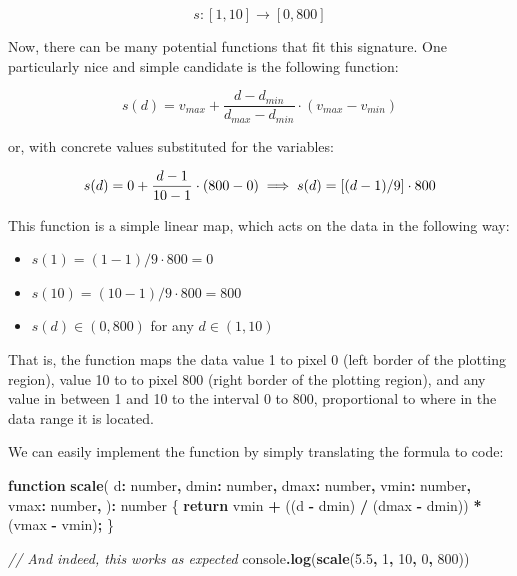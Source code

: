 \documentclass[
]{book}
\newenvironment{Shaded}{\begin{snugshade}}{\end{snugshade}}
\newcommand{\BuiltInTok}[1]{#1}
\newcommand{\CommentTok}[1]{\textcolor[rgb]{0.56,0.35,0.01}{\textit{#1}}}
\newcommand{\ControlFlowTok}[1]{\textcolor[rgb]{0.13,0.29,0.53}{\textbf{#1}}}
\newcommand{\DataTypeTok}[1]{\textcolor[rgb]{0.13,0.29,0.53}{#1}}
\newcommand{\DecValTok}[1]{\textcolor[rgb]{0.00,0.00,0.81}{#1}}
\newcommand{\FloatTok}[1]{\textcolor[rgb]{0.00,0.00,0.81}{#1}}
\newcommand{\FunctionTok}[1]{\textcolor[rgb]{0.13,0.29,0.53}{\textbf{#1}}}
\newcommand{\KeywordTok}[1]{\textcolor[rgb]{0.13,0.29,0.53}{\textbf{#1}}}
\newcommand{\NormalTok}[1]{#1}
\newcommand{\OperatorTok}[1]{\textcolor[rgb]{0.81,0.36,0.00}{\textbf{#1}}}
\providecommand{\tightlist}{%
  \setlength{\itemsep}{0pt}\setlength{\parskip}{0pt}}
\theoremstyle{definition}
\theoremstyle{definition}
\theoremstyle{definition}
\theoremstyle{definition}
\theoremstyle{remark}
\begin{document}
\[s: [1, 10] \to [0, 800]\]

Now, there can be many potential functions that fit this signature. One particularly nice and simple candidate is the following function:

\[s(d) = v_{max} + \frac{d - d_{min}}{d_{max} - d_{min}} \cdot (v_{max} - v_{min})\]

or, with concrete values substituted for the variables:

\[s(d) = 0 + \frac{d - 1}{10 - 1} \cdot (800 - 0) \\ \implies s(d) = [(d - 1) / 9] \cdot 800\]

This function is a simple linear map, which acts on the data in the following way:

\begin{itemize}
\tightlist
\item
  \(s(1) = (1 - 1) / 9 \cdot 800 = 0\)
\item
  \(s(10) = (10 - 1) / 9 \cdot 800 = 800\)
\item
  \(s(d) \in (0, 800)\) for any \(d \in (1, 10)\)
\end{itemize}

That is, the function maps the data value 1 to pixel 0 (left border of the plotting region), value 10 to to pixel 800 (right border of the plotting region), and any value in between 1 and 10 to the interval 0 to 800, proportional to where in the data range it is located.

We can easily implement the function by simply translating the formula to code:

\begin{Shaded}
\begin{Highlighting}[]
\KeywordTok{function} \FunctionTok{scale}\NormalTok{(}
\NormalTok{  d}\OperatorTok{:} \DataTypeTok{number}\OperatorTok{,}
\NormalTok{  dmin}\OperatorTok{:} \DataTypeTok{number}\OperatorTok{,}
\NormalTok{  dmax}\OperatorTok{:} \DataTypeTok{number}\OperatorTok{,}
\NormalTok{  vmin}\OperatorTok{:} \DataTypeTok{number}\OperatorTok{,}
\NormalTok{  vmax}\OperatorTok{:} \DataTypeTok{number}\OperatorTok{,}
\NormalTok{)}\OperatorTok{:} \DataTypeTok{number}\NormalTok{ \{}
  \ControlFlowTok{return}\NormalTok{ vmin }\OperatorTok{+}\NormalTok{ ((d }\OperatorTok{{-}}\NormalTok{ dmin) }\OperatorTok{/}\NormalTok{ (dmax }\OperatorTok{{-}}\NormalTok{ dmin)) }\OperatorTok{*}\NormalTok{ (vmax }\OperatorTok{{-}}\NormalTok{ vmin)}\OperatorTok{;}
\NormalTok{\}}

\CommentTok{// And indeed, this works as expected}
\BuiltInTok{console}\OperatorTok{.}\FunctionTok{log}\NormalTok{(}\FunctionTok{scale}\NormalTok{(}\FloatTok{5.5}\OperatorTok{,} \DecValTok{1}\OperatorTok{,} \DecValTok{10}\OperatorTok{,} \DecValTok{0}\OperatorTok{,} \DecValTok{800}\NormalTok{))}
\end{Highlighting}
\end{Shaded}
\end{document}
